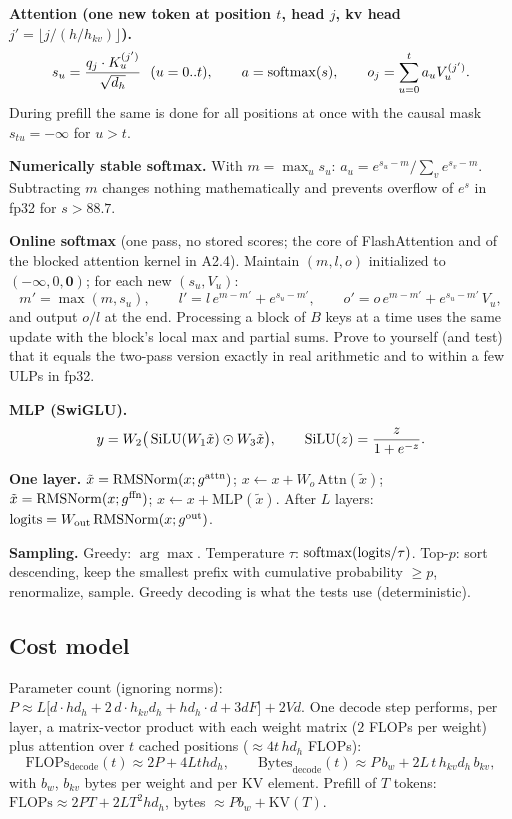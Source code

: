 \textbf{Attention (one new token at position $t$, head $j$, kv head $j' = \lfloor j / (h/h_{kv})\rfloor$).}
\begin{equation}
s_u = \frac{q_j\cdot K^{(j')}_u}{\sqrt{d_h}}\ \ (u=0..t),\qquad a = \operatorname{softmax}(s),\qquad o_j = \sum_{u=0}^{t} a_u V^{(j')}_u .
\end{equation}
During prefill the same is done for all positions at once with the causal mask $s_{tu} = -\infty$ for $u>t$.

\textbf{Numerically stable softmax.} With $m = \max_u s_u$: $a_u = e^{s_u - m}/\sum_v e^{s_v-m}$. Subtracting $m$ changes nothing mathematically and prevents overflow of $e^{s}$ in fp32 for $s > 88.7$.

\textbf{Online softmax} (one pass, no stored scores; the core of FlashAttention and of the blocked attention kernel in A2.4). Maintain $(m, l, o)$ initialized to $(-\infty, 0, \mathbf{0})$; for each new $(s_u, V_u)$:
\begin{equation}
m' = \max(m, s_u),\qquad l' = l\,e^{m-m'} + e^{s_u - m'},\qquad o' = o\,e^{m-m'} + e^{s_u-m'}\,V_u,
\end{equation}
and output $o/l$ at the end. Processing a block of $B$ keys at a time uses the same update with the block's local max and partial sums. Prove to yourself (and test) that it equals the two-pass version exactly in real arithmetic and to within a few ULPs in fp32.

\textbf{MLP (SwiGLU).}
\begin{equation}
y = W_2\big(\operatorname{SiLU}(W_1 \tilde{x}) \odot W_3 \tilde{x}\big),\qquad \operatorname{SiLU}(z) = \frac{z}{1+e^{-z}}.
\end{equation}

\textbf{One layer.} $\tilde{x} = \operatorname{RMSNorm}(x; g^{\text{attn}})$; $x \leftarrow x + W_o\,\mathrm{Attn}(\tilde{x})$; $\tilde{x} = \operatorname{RMSNorm}(x; g^{\text{ffn}})$; $x \leftarrow x + \mathrm{MLP}(\tilde{x})$. After $L$ layers: $\text{logits} = W_{\text{out}}\operatorname{RMSNorm}(x; g^{\text{out}})$.

\textbf{Sampling.} Greedy: $\arg\max$. Temperature $\tau$: $\operatorname{softmax}(\text{logits}/\tau)$. Top-$p$: sort descending, keep the smallest prefix with cumulative probability $\ge p$, renormalize, sample. Greedy decoding is what the tests use (deterministic).

\subsection{Cost model}

Parameter count (ignoring norms): $P \approx L\big[d\cdot hd_h + 2\,d\cdot h_{kv}d_h + hd_h\cdot d + 3dF\big] + 2Vd$. One decode step performs, per layer, a matrix-vector product with each weight matrix ($2$ FLOPs per weight) plus attention over $t$ cached positions ($\approx 4 t\, h d_h$ FLOPs):
\begin{equation}
\text{FLOPs}_{\text{decode}}(t) \approx 2P + 4Lthd_h,\qquad
\text{Bytes}_{\text{decode}}(t) \approx P\,b_w + 2L\,t\,h_{kv}d_h\,b_{kv},
\end{equation}
with $b_w$, $b_{kv}$ bytes per weight and per KV element. Prefill of $T$ tokens: $\text{FLOPs} \approx 2PT + 2LT^2hd_h$, bytes $\approx P b_w + \text{KV}(T)$.

